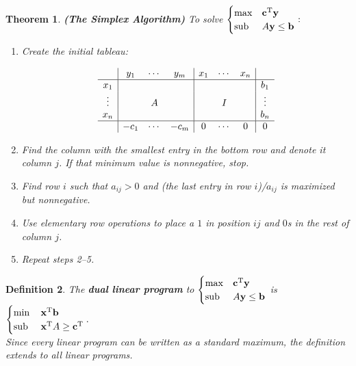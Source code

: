 \documentclass{article}
\theoremstyle{colontheorem}
\newtheorem{theorem}{Theorem}[section]
\newtheorem{definition}[theorem]{Definition}
\newcommand{\T}{^\textnormal{T}}
\newcommand{\Sub}{\textnormal{sub }}
\newenvironment{Theorem}
{
	\begin{mdframed}[backgroundcolor=TheoremOrange!10]
	\begin{theorem}
}
{
	\end{theorem}
	\end{mdframed}
	
	\vspace{.15in}
}
\newenvironment{Def}
{
	\begin{mdframed}[backgroundcolor=DefGreen!10]
	\begin{definition}
}
{
	\end{definition}
	\end{mdframed}
	
	\vspace{.15in}
}
\begin{document}
\begin{Theorem}
	
	\textbf{(The Simplex Algorithm)} To solve $
	\begin{cases}
	\max & \mathbf{c}\T \mathbf{y}\\
	\Sub & A \mathbf{y} \leq \mathbf{b}
	\end{cases}:
	$
	
	\begin{enumerate}
		
		\item Create the initial tableau:
		
		$$
			\begin{array}{c|ccc|ccc|c}
				& y_1 & \cdots & y_m & x_1 & \cdots & x_n & \\
				\hline
				x_1 & & & & & & & b_1\\
				\vdots & & A & & & I & & \vdots\\
				x_n & & & & & & & b_n\\
				\hline
	   			& -c_1 & \cdots & -c_m & 0 & \cdots & 0 & 0
			\end{array}
		$$
		
		\item Find the column with the smallest entry in the bottom row and denote it column $j$. If that minimum value is nonnegative, stop.
		
		\item Find row $i$ such that $a_{ij} > 0$ and (the last entry in row $i$)/$a_{ij}$ is maximized but nonnegative.
		
		\item Use elementary row operations to place a $1$ in position $ij$ and $0$s in the rest of column $j$.
		
		\item Repeat steps 2--5.
		
	\end{enumerate}
	
\end{Theorem}



\begin{Def}
	
	The \textbf{dual linear program} to $
	\begin{cases}
	\max & \mathbf{c}\T \mathbf{y}\\
	\Sub & A \mathbf{y} \leq \mathbf{b}
	\end{cases}$ is $
	\begin{cases}
	\min & \mathbf{x}\T \mathbf{b}\\
	\Sub & \mathbf{x}\T A \geq \mathbf{c}\T
	\end{cases}.$\\
	
	Since every linear program can be written as a standard maximum, the definition extends to all linear programs.
	
\end{Def}
\end{document}
